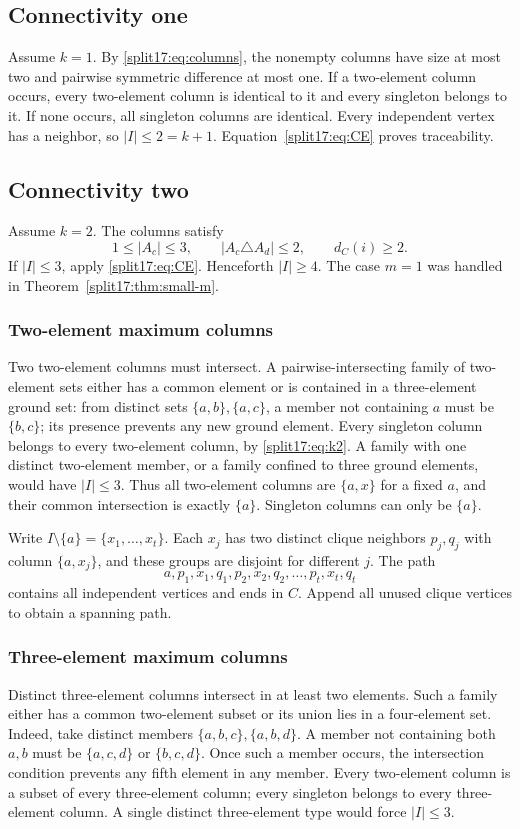 \documentclass[11pt,a4paper]{article}
\theoremstyle{definition}\newtheorem{definition}[theorem]{Definition}
\theoremstyle{remark}\newtheorem{remark}[theorem]{Remark}
\begin{document}
\subsection{Connectivity one}\label{split17:sec:k1}
Assume $k=1$. By \eqref{split17:eq:columns}, the nonempty columns have size at most
two and pairwise symmetric difference at most one. If a two-element
column occurs, every two-element column is identical to it and every
singleton belongs to it. If none occurs, all singleton columns are
identical. Every independent vertex has a neighbor, so $|I|\le2=k+1$.
Equation~\eqref{split17:eq:CE} proves traceability.

\subsection{Connectivity two}\label{split17:sec:k2}
Assume $k=2$. The columns satisfy
\begin{equation}\label{split17:eq:k2}
 1\le|A_c|\le3,\qquad |A_c\triangle A_d|\le2,
 \qquad d_C(i)\ge2.
\end{equation}
If $|I|\le3$, apply \eqref{split17:eq:CE}. Henceforth $|I|\ge4$.
The case $m=1$ was handled in Theorem~\ref{split17:thm:small-m}.

\subsubsection{Two-element maximum columns}
Two two-element columns must intersect. A pairwise-intersecting family of
two-element sets either has a common element or is contained in a
three-element ground set: from distinct sets $\{a,b\},\{a,c\}$, a member
not containing $a$ must be $\{b,c\}$; its presence prevents any new ground
element. Every singleton column belongs to every two-element column, by
\eqref{split17:eq:k2}. A family with one distinct two-element member, or a family
confined to three ground elements, would have $|I|\le3$.
Thus all two-element columns are $\{a,x\}$ for a fixed $a$, and their
common intersection is exactly $\{a\}$. Singleton columns can only be $\{a\}$.

Write $I\setminus\{a\}=\{x_1,\ldots,x_t\}$. Each $x_j$ has two distinct
clique neighbors $p_j,q_j$ with column $\{a,x_j\}$, and these groups are
disjoint for different $j$. The path
\[
 a,p_1,x_1,q_1,p_2,x_2,q_2,\ldots,p_t,x_t,q_t
\]
contains all independent vertices and ends in $C$. Append all unused
clique vertices to obtain a spanning path.

\subsubsection{Three-element maximum columns}
Distinct three-element columns intersect in at least two elements.
Such a family either has a common two-element subset or its union lies
in a four-element set. Indeed, take distinct members
$\{a,b,c\},\{a,b,d\}$. A member not containing both $a,b$ must be
$\{a,c,d\}$ or $\{b,c,d\}$. Once such a member occurs, the intersection
condition prevents any fifth element in any member.
Every two-element column is a subset of every three-element column;
every singleton belongs to every three-element column. A single distinct
three-element type would force $|I|\le3$.
\end{document}
